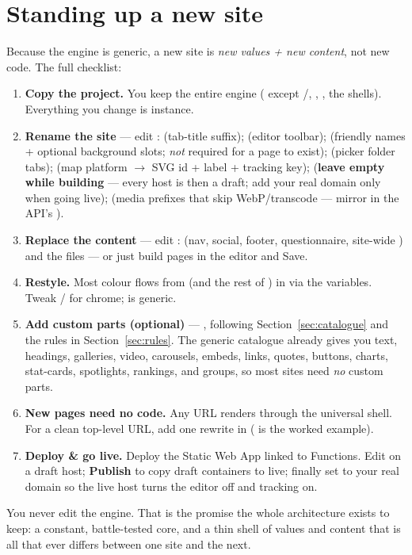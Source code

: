 \documentclass[11pt]{article}
\begin{document}
\section{Standing up a new site}

Because the engine is generic, a new site is \emph{new values + new content}, not
new code. The full checklist:

\begin{enumerate}[leftmargin=1.5em, itemsep=3pt]
\item \textbf{Copy the project.} You keep the entire engine
( except /,
, , the shells). Everything you change is
instance.
\item \textbf{Rename the site} --- edit :
 (tab-title suffix);  (editor toolbar);
 (friendly names + optional background slots; \emph{not} required for
a page to exist);  (picker folder tabs);  (map
platform $\rightarrow$ SVG  id + label + tracking key);
 (\textbf{leave empty while building} --- every host is then a
draft; add your real domain only when going live);  (media
prefixes that skip WebP/transcode --- mirror in the API's
).
\item \textbf{Replace the content} --- edit : 
(nav, social, footer, questionnaire, site-wide ) and the
 files --- or just build pages in the editor and Save.
\item \textbf{Restyle.} Most colour flows from  (and the rest
of ) in  via the  variables. Tweak
/ for chrome;  is generic.
\item \textbf{Add custom parts (optional)} --- ,
following Section~\ref{sec:catalogue} and the rules in Section~\ref{sec:rules}. The
generic catalogue already gives you text, headings, galleries, video, carousels,
embeds, links, quotes, buttons, charts, stat-cards, spotlights, rankings, and
groups, so most sites need \emph{no} custom parts.
\item \textbf{New pages need no code.} Any  URL renders
 through the universal shell. For a clean top-level
URL, add one rewrite in  ( is the
worked example).
\item \textbf{Deploy \& go live.} Deploy the  Static Web App linked to
 Functions. Edit on a draft host; \textbf{Publish} to copy draft
containers to live; finally set  to your real domain so the live
host turns the editor off and tracking on.
\end{enumerate}

You never edit the engine. That is the promise the whole architecture exists to
keep: a constant, battle-tested core, and a thin shell of values and content that
is all that ever differs between one site and the next.
\end{document}
